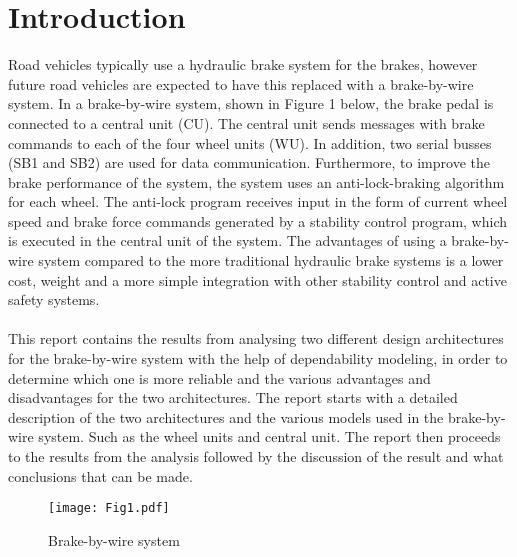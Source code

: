 \newpage
\section{Introduction}
Road vehicles typically use a hydraulic brake system for the brakes, however future road vehicles are expected to have this replaced with a brake-by-wire system. In a brake-by-wire system, shown in Figure 1 below, the brake pedal is connected to a central unit (CU). The central unit sends messages with brake commands to each of the four wheel units (WU). In addition, two serial busses (SB1 and SB2) are used for data communication. Furthermore, to improve the brake performance of the system, the system uses an anti-lock-braking algorithm for each wheel. The anti-lock program receives input in the form of current wheel speed and brake force commands generated by a stability control program, which is executed in the central unit of the system.  The advantages of using a brake-by-wire system compared to the more traditional hydraulic brake systems is a lower cost, weight and a more simple integration with other stability control and active safety systems.\\
\\
This report contains the results from analysing two different design architectures for the brake-by-wire system with the help of dependability modeling, in order to determine which one is more reliable and the various advantages and disadvantages for the two architectures. The report starts with a detailed description of the two architectures and the various models used in the brake-by-wire system. Such as the wheel units and central unit. The report then proceeds to the results from the analysis followed by the discussion of the result and what conclusions that can be made.

\begin{figure}[h!]
  \centering
  \texttt{[image: Fig1.pdf]}
  \caption{Brake-by-wire system}
  \label{fig1}
\end{figure}
